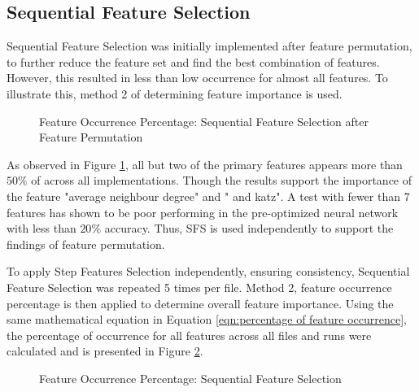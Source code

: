 \documentclass{tum-book}
\begin{document}
        
        \newpage\subsection{Sequential Feature Selection}\label{subsection:Sequential Feature Selection result}
        Sequential Feature Selection was initially implemented after feature permutation, to further reduce the feature set and find the best combination of features. However, this resulted in less than low occurrence for almost all features. To illustrate this, method 2 of determining feature importance is used. 
        
        \begin{figure}[ht]
        \centering
            
            \caption{Feature Occurrence Percentage: Sequential Feature Selection after Feature Permutation}
            \label{fig:Feature Occurrence Percentage: Sequential Feature Selection after Feature Permutation}
        \end{figure}
        
        \noindent
        As observed in Figure \ref{fig:Feature Occurrence Percentage: Sequential Feature Selection after Feature Permutation}, all but two of the primary features appears more than $50\%$ of across all implementations. Though the results support the importance of the feature "average neighbour degree" and " and katz". A test with fewer than 7 features has shown to be poor performing in the pre-optimized neural network with less than $20\%$ accuracy. Thus, SFS is used independently to support the findings of feature permutation.
        
        
        \bigskip\noindent
        To apply Step Features Selection independently, ensuring consistency, Sequential Feature Selection was repeated 5 times per file. Method 2, feature occurrence percentage is then applied to determine overall feature importance. Using the same mathematical equation in Equation \ref{eqn:percentage of feature occurrence}, the percentage of occurrence for all features across all files and runs were calculated and is presented in Figure \ref{fig:Feature Occurrence Percentage: Sequential Feature Selection}.
        
        
        \newpage\begin{figure}
        \centering
            
            \caption{Feature Occurrence Percentage: Sequential Feature Selection}
            \label{fig:Feature Occurrence Percentage: Sequential Feature Selection}
        \end{figure}
        
\end{document}
